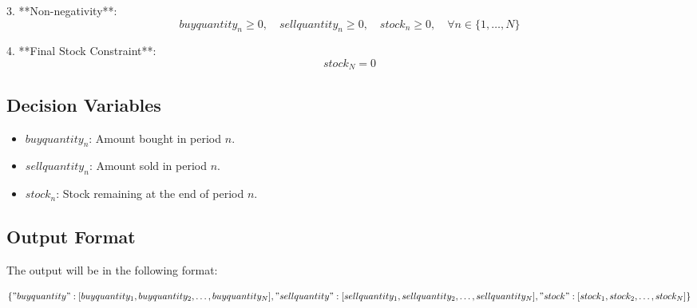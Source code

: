 \documentclass{article}
\begin{document}
3. **Non-negativity**:
   \[
   buyquantity_n \geq 0, \quad sellquantity_n \geq 0, \quad stock_n \geq 0, \quad \forall n \in \{1, \ldots, N\}
   \]

4. **Final Stock Constraint**:
   \[
   stock_N = 0
   \]

\subsection*{Decision Variables}
\begin{itemize}
    \item \( buyquantity_n \): Amount bought in period \( n \).
    \item \( sellquantity_n \): Amount sold in period \( n \).
    \item \( stock_n \): Stock remaining at the end of period \( n \).
\end{itemize}

\subsection*{Output Format}
The output will be in the following format:

\[
\{
    "buyquantity": [buyquantity_1, buyquantity_2, \ldots, buyquantity_N],
    "sellquantity": [sellquantity_1, sellquantity_2, \ldots, sellquantity_N],
    "stock": [stock_1, stock_2, \ldots, stock_N]
\}
\]
\end{document}
